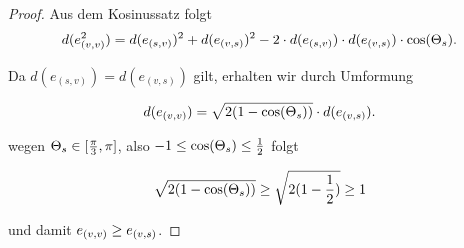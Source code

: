 \begin{proof}



Aus dem Kosinussatz folgt 
\begin{align*}
    d(\irregulaereKante*^2) &=  d(e_{(s,v)})^2 + d(e_{(v,s)})^2-2 \cdot d(e_{(s,v)})  \cdot d(e_{(v,s)}) \cdot \cos(\gesamtwinkel*[s]). \\
\end{align*}

Da $d(e_{(s,v)}) = d(e_{(v,s)})$ gilt, erhalten wir durch Umformung

\begin{align*}
    d(\irregulaereKante*)&= \sqrt{2 (1-\cos(\gesamtwinkel*[s]))}\cdot d(\regulaereKante*).\\
\end{align*}

wegen $\gesamtwinkel*[s] \in  [\frac{\pi}{3}, \pi]$, also $-1 \leq \cos(\gesamtwinkel*[s]) \leq \frac{1}{2}$  folgt

\begin{align*}
     \sqrt{2 (1-\cos(\gesamtwinkel*[s]))} \geq \sqrt{2 (1-\frac{1}{2})} \geq 1\\
\end{align*}

und damit $\irregulaereKante* \geq \regulaereKante* $. 


\end{proof}



